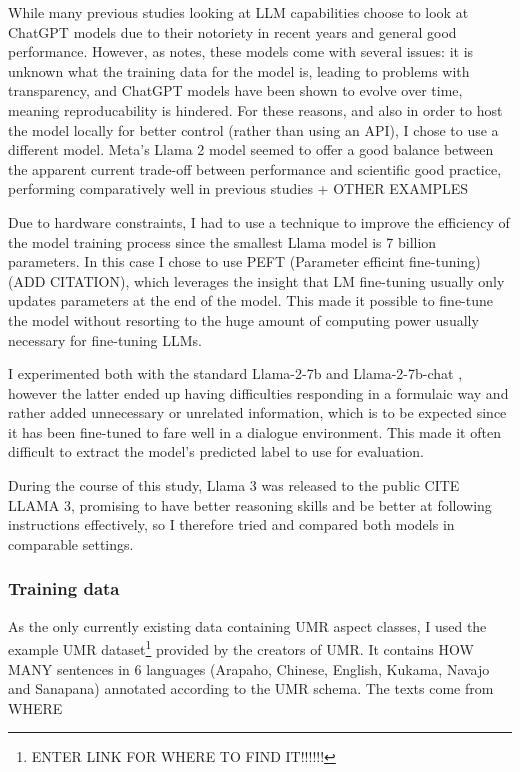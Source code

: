 While many previous studies looking at LLM capabilities choose to look at ChatGPT models due to their notoriety in recent years and general good performance. However, as \citet{törnberg2024best} notes, these models come with several issues: it is unknown what the training data for the model is, leading to problems with transparency, and ChatGPT models have been shown to evolve over time, meaning reproducability is hindered. For these reasons, and also in order to host the model locally for better control (rather than using an API), I chose to use a different model. Meta's Llama 2 model seemed to offer a good balance between the apparent current trade-off between performance and scientific good practice, performing comparatively well in previous studies \citep{yuan2023futureTimeLlama} + OTHER EXAMPLES

Due to hardware constraints, I had to use a technique to improve the efficiency of the model training process since the smallest Llama model is 7 billion parameters. In this case I chose to use PEFT (Parameter efficint fine-tuning) (ADD CITATION), which leverages the insight that LM fine-tuning usually only updates parameters at the end of the model. This made it possible to fine-tune the model without resorting to the huge amount of computing power usually necessary for fine-tuning LLMs.

I experimented both with the standard \textsf{Llama-2-7b} and \textsf{Llama-2-7b-chat} \citep{touvron2023llama}, however the latter ended up having difficulties responding in a formulaic way and rather added unnecessary or unrelated information, which is to be expected since it has been fine-tuned to fare well in a dialogue environment. This made it often difficult to extract the model's predicted label to use for evaluation. 

During the course of this study, Llama 3 was released to the public CITE LLAMA 3, promising to have better reasoning skills and be better at following instructions effectively, so I therefore tried and compared both models in comparable settings.

\subsubsection*{Training data}
As the only currently existing data containing UMR aspect classes, I used the example UMR dataset\footnote{ENTER LINK FOR WHERE TO FIND IT!!!!!!} provided by the creators of UMR. It contains HOW MANY sentences in 6 languages (Arapaho, Chinese, English, Kukama, Navajo and Sanapana) annotated according to the UMR schema. The texts come from WHERE 

